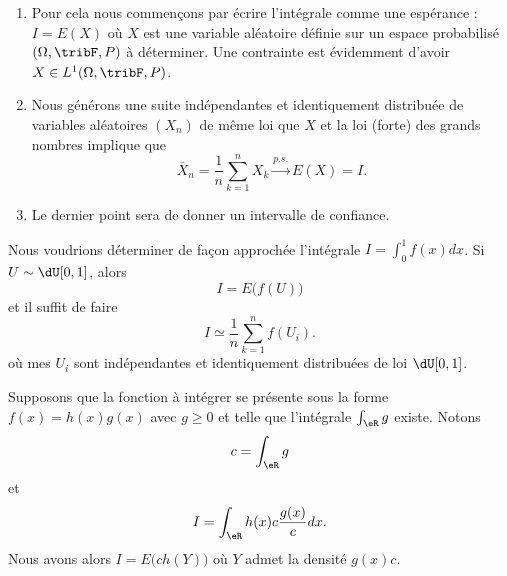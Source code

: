 \begin{enumerate}
    \item
        Pour cela nous commençons par écrire l'intégrale comme une espérance : \( I=E(X)\) où \( X\) est une variable aléatoire définie sur un espace probabilisé \( (\Omega,\tribF,P)\) à déterminer. Une contrainte est évidemment d'avoir \( X\in L^1(\Omega,\tribF,P)\).

    \item
        Nous générons une suite indépendantes et identiquement distribuée de variables aléatoires \( (X_n)\) de même loi que \( X\) et la loi (forte) des grands nombres implique que
        \begin{equation}
            \bar X_n=\frac{1}{ n }\sum_{k=1}^nX_k\stackrel{p.s.}{\longrightarrow} E(X)=I.
        \end{equation}
        
    \item
        Le dernier point sera de donner un intervalle de confiance.
\end{enumerate}
 
\begin{example}     \label{ExempleIintfdxEXu}
    Nous voudrions déterminer de façon approchée l'intégrale \( I=\int_0^1 f(x)dx\). Si \( U\sim\dU\mathopen[ 0 , 1 \mathclose]\), alors
    \begin{equation}
        I=E\big( f(U) \big)
    \end{equation}
    et il suffit de faire
    \begin{equation}
        I\simeq\frac{1}{ n }\sum_{k=1}^nf(U_i).
    \end{equation}
    où mes \( U_i\) sont indépendantes et identiquement distribuées de loi \( \dU\mathopen[ 0 , 1 \mathclose]\).
\end{example}

\begin{example}
    Supposons que la fonction à intégrer se présente sous la forme \( f(x)=h(x)g(x)\) avec \( g\geq 0\) et telle que l'intégrale \( \int_{\eR}g\) existe. Notons
    \begin{equation}
        c=\int_{\eR}g
    \end{equation}
    et
    \begin{equation}
        I=\int_{\eR}h(x)c\frac{ g(x) }{ c }dx.
    \end{equation}
    Nous avons alors \( I=E\big( ch(Y) \big)\) où \( Y\) admet la densité \( g(x)c\).
\end{example}

